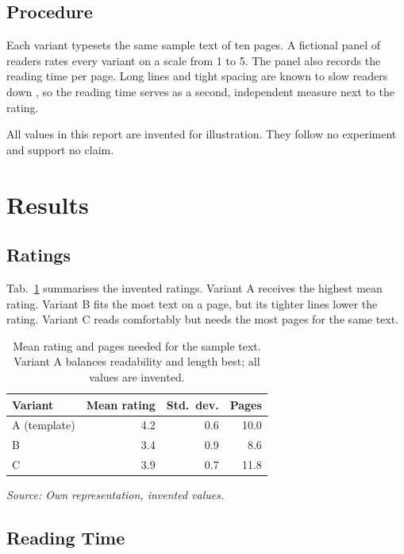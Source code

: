 \documentclass[11pt,a4paper]{article}
\newcommand{\srcnote}[2][\linewidth]{%
  {\setlength{\parskip}{0pt}\par\nobreak\vspace{6pt}%
   \noindent\parbox{#1}{\raggedright\itshape\fontsize{10}{12}\selectfont Source: #2}\par}}
\renewcommand{\arraystretch}{1.1}
\newcommand{\tablefontsize}{\fontsize{9}{10.5}\selectfont
  \renewcommand{\arraystretch}{1.0}\setlength{\tabcolsep}{6pt}}
\begin{document}
\subsection{Procedure}

Each variant typesets the same sample text of ten pages. A fictional panel of
readers rates every variant on a scale from 1 to 5. The panel also records
the reading time per page. Long lines and tight spacing are known to slow
readers down \parencite[p.~92]{mittelbach2004}, so the reading time serves as
a second, independent measure next to the rating.

All values in this report are invented for illustration. They follow no
experiment and support no claim.

\section{Results}

\subsection{Ratings}

Tab.~\ref{tab:ratings} summarises the invented ratings. Variant A receives
the highest mean rating. Variant B fits the most text on a page, but its
tighter lines lower the rating. Variant C reads comfortably but needs the
most pages for the same text.

\begin{table}[H]
  \centering
  \caption{Mean rating and pages needed for the sample text. Variant A
  balances readability and length best; all values are invented.}
  \label{tab:ratings}
  {\tablefontsize
  \begin{tabular}{@{}lrrr@{}}
    \toprule
    Variant & Mean rating & Std.\ dev. & Pages \\
    \midrule
    \rowcolor{black!8}
    A (template) & 4.2 & 0.6 & 10.0 \\
    B            & 3.4 & 0.9 &  8.6 \\
    C            & 3.9 & 0.7 & 11.8 \\
    \bottomrule
  \end{tabular}}
  \srcnote{Own representation, invented values.}
\end{table}

\subsection{Reading Time}
\end{document}
